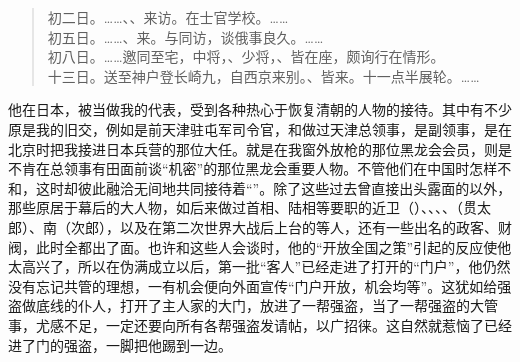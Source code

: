 \begin{quote}
初二日。……、、来访。在士官学校。……\\

初五日。……、来。与同访，谈俄事良久。……\\

初八日。……邀同至宅，中将，、少将，、皆在座，颇询行在情形。\\

十三日。送至神户登长崎九，自西京来别。、皆来。十一点半展轮。……\\
\end{quote}

他在日本，被当做我的代表，受到各种热心于恢复清朝的人物的接待。其中有不少原是我的旧交，例如是前天津驻屯军司令官，和做过天津总领事，是副领事，是在北京时把我接进日本兵营的那位大任。就是在我窗外放枪的那位黑龙会会员，则是不肯在总领事有田面前谈“机密”的那位黑龙会重要人物。不管他们在中国时怎样不和，这时却彼此融洽无间地共同接待着“”。除了这些过去曾直接出头露面的以外，那些原居于幕后的大人物，如后来做过首相、陆相等要职的近卫（）、、、、（贯太郎）、南（次郎），以及在第二次世界大战后上台的等人，还有一些出名的政客、财阀，此时全都出了面。也许和这些人会谈时，他的“开放全国之策”引起的反应使他太高兴了，所以在伪满成立以后，第一批“客人”已经走进了打开的“门户”，他仍然没有忘记共管的理想，一有机会便向外面宣传“门户开放，机会均等”。这犹如给强盗做底线的仆人，打开了主人家的大门，放进了一帮强盗，当了一帮强盗的大管事，尤感不足，一定还要向所有各帮强盗发请帖，以广招徕。这自然就惹恼了已经进了门的强盗，一脚把他踢到一边。
